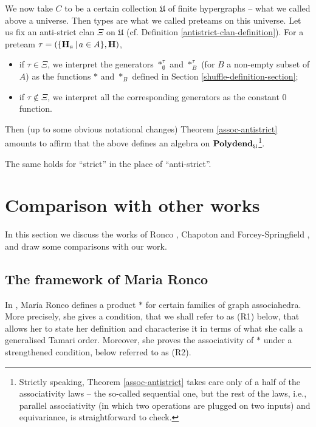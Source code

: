 \documentclass{article}
\theoremstyle{plain}
\theoremstyle{definition}
\begin{document}
We now take $C$ to be a certain collection $\mathfrak{U}$ of finite hypergraphs -- what we called above a universe. 
Then types are what we called preteams on this universe. Let us fix an anti-strict clan $\Xi$ on $\mathfrak{U}$  
(cf. Definition \ref{antistrict-clan-definition}). 
For a preteam $\tau=(\{{\bf H}_a\,|\, a\in A\},{\bf H})$,
\begin{itemize}
\item if $\tau\in \Xi$, we interpret the generators $\ast^\tau_{\emptyset}$ and $\ast^\tau_B$ (for $B$ a non-empty subset of $A$) as the functions $\ast$ and $\ast_B$ defined in 
Section \ref{shuffle-definition-section};
\item  if $\tau\not\in \Xi$, we interpret  all
the corresponding generators as the constant $0$ function.
\end{itemize}
Then (up to some obvious notational changes) Theorem \ref{assoc-antistrict} amounts to affirm that the above defines an algebra on ${\bf Polydend}_{\mathfrak{U}}$\footnote{Strictly speaking, Theorem \ref{assoc-antistrict} takes care only of a half of the associativity laws -- the so-called sequential one, but the rest of the laws, i.e., parallel associativity (in which two operations are plugged on two inputs) and equivariance, is straightforward to check.}.

\smallskip
The same holds for ``strict'' in the place of ``anti-strict''. 

\section{Comparison with other works} \label{comparison-section}
In this section  we discuss the works of  Ronco \cite{RoncoGTO}, Chapoton  \cite{Cha1,Cha2} and Forcey-Springfield \cite{FS}, and draw some comparisons with our work.  
\subsection{The framework of Maria Ronco  \cite{RoncoGTO}}
 In \cite{RoncoGTO},  Mar\' ia Ronco defines a  product $\ast$   for certain families of graph associahedra. More precisely,  she  gives  a condition,  that we shall refer to as (R1) below,  that allows her to state her definition and characterise it in terms of what she calls a generalised Tamari order.
 Moreover, she proves the associativity of $\ast$ under a strengthened condition, below referred to as (R2).

\smallskip
 
\end{document}

